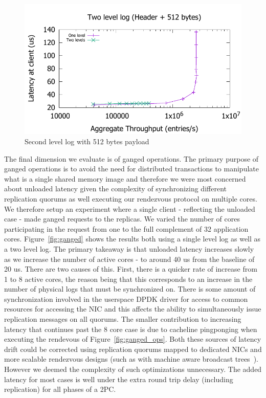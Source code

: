 \documentclass[pageno]{jpaper}
\begin{document}
\begin{figure}
\includegraphics[scale=0.6]{results2/flashlog_512.pdf}
\caption{Second level log with 512 bytes payload}
\label{fig:flashlog_512}
\end{figure}

The final dimension we evaluate is of ganged operations. The primary purpose of
ganged operations is to avoid the need for distributed transactions to
manipulate what is a single shared memory image and therefore we were most
concerned about unloaded latency given the complexity of synchronizing different
replication quorums as well executing our rendezvous protocol on multiple
cores. We therefore setup an experiment where a single client - reflecting the
unloaded case - made ganged requests to the replicas. We varied the number of
cores participating in the request from one to the full complement of 32
application cores. Figure~\ref{fig:ganged} shows the results both using a single
level log as well as a two level log. The primary takeaway is that unloaded
latency increases slowly as we increase the number of active cores - to around
40 us from the baseline of 20 us. There are two causes of this. First, there is
a quicker rate of increase from 1 to 8 active cores, the reason being that this
corresponds to an increase in the number of physical logs that must be
synchronized on. There is some amount of synchronization involved in the
userspace DPDK driver for access to common resources for accessing the NIC and
this affects the ability to simultaneously issue replication messages on all
quorums. The smaller contribution to increasing latency that continues past the
8 core case is due to cacheline pingponging when executing the rendevous of
Figure~\ref{fig:ganged_ops}. Both these sources of latency drift could be
corrected using replication quorums mapped to dedicated NICs and more scalable
rendezvous designs (such as with machine aware broadcast
trees~\cite{broadcast_tree}). However we deemed the complexity of such
optimizations unnecessary. The added latency for most cases is well under the
extra round trip delay (including replication) for all phases of a 2PC.
\end{document}
